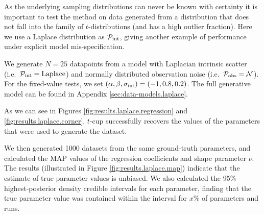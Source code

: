 \documentclass[fleqn,usenatbib]{rasti}
\begin{document}
As the underlying sampling distributions can never be known with certainty it is important to test the method on data generated from a distribution that does not fall into the family of $t$-distributions (and has a high outlier fraction).  Here
we use a Laplace distribution as $\mathcal P_{\rm int}$, giving another example
of performance under explicit model mis-specification.

We generate $N = 25$ datapoints from a model with Laplacian intrinsic scatter
(i.e.\ $\mathcal P_{\rm int} = \mathrm{Laplace}$) and normally distributed observation
noise (i.e.\ $\mathcal P_{\rm obs} = \mathcal N$). For the fixed-value tests, we
set $(\alpha, \beta, \sigma_{\rm int}) = (-1, 0.8, 0.2)$. The full
generative model can be found in Appendix \ref{sec:data-models.laplace}.



As we can see in Figures \ref{fig:results.laplace.regression} and
\ref{fig:results.laplace.corner}, $t$-cup successfully recovers the values of the parameters that were
used to generate the dataset.

We then generated 1000 datasets from the same ground-truth parameters, and
calculated the MAP values of the regression coefficients
and shape parameter $\nu$. The results (illustrated in Figure
\ref{fig:results.laplace.map}) indicate that the estimate of true parameter
values is unbiased.{ \color{red} We also calculated the 95\% highest-posterior
density credible intervals for each parameter, finding that the true parameter
value was contained within the interval for $x$\% of parameters and runs.  }
\end{document}

